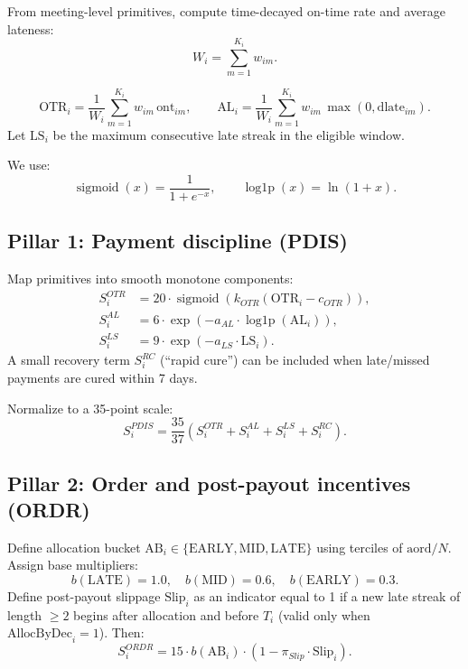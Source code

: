 \documentclass[11t]{article}
\newcommand{\sigmoid}{\operatorname{sigmoid}}
\newcommand{\logonep}{\operatorname{log1p}}
\begin{document}
From meeting-level primitives, compute time-decayed on-time rate and average lateness:
\begin{equation}
W_i = \sum_{m=1}^{K_i} w_{im}.
\end{equation}

\begin{equation}
\text{OTR}_i = \frac{1}{W_i}\sum_{m=1}^{K_i} w_{im}\,\text{ont}_{im},
\qquad
\text{AL}_i  = \frac{1}{W_i}\sum_{m=1}^{K_i} w_{im}\,\max(0,\text{dlate}_{im}).
\end{equation}
Let $\text{LS}_i$ be the maximum consecutive late streak in the eligible window.

We use:
\begin{equation}
\sigmoid(x)=\frac{1}{1+e^{-x}}, \qquad \logonep(x)=\ln(1+x).
\end{equation}

\subsection{Pillar 1: Payment discipline (PDIS)}

Map primitives into smooth monotone components:
\begin{align}
S^{OTR}_i &= 20\cdot \sigmoid\!\left(k_{OTR}(\text{OTR}_i-c_{OTR})\right),\\
S^{AL}_i  &= 6\cdot \exp\!\left(-a_{AL}\cdot \logonep(\text{AL}_i)\right),\\
S^{LS}_i  &= 9\cdot \exp\!\left(-a_{LS}\cdot \text{LS}_i\right).
\end{align}
A small recovery term $S^{RC}_i$ (``rapid cure'') can be included when late/missed payments are cured within 7 days.

Normalize to a 35-point scale:
\begin{equation}
S^{PDIS}_i = \frac{35}{37}\left(S^{OTR}_i+S^{AL}_i+S^{LS}_i+S^{RC}_i\right).
\end{equation}

\subsection{Pillar 2: Order and post-payout incentives (ORDR)}

Define allocation bucket $\text{AB}_i \in \{\text{EARLY},\text{MID},\text{LATE}\}$ using terciles of $\text{aord}/N$. Assign base multipliers:
\begin{equation}
b(\text{LATE})=1.0,\quad b(\text{MID})=0.6,\quad b(\text{EARLY})=0.3.
\end{equation}
Define post-payout slippage $\text{Slip}_i$ as an indicator equal to 1 if a new late streak of length $\ge 2$ begins after allocation and before $T_i$ (valid only when $\text{AllocByDec}_i=1$). Then:
\begin{equation}
S^{ORDR}_i = 15\cdot b(\text{AB}_i)\cdot (1-\pi_{Slip}\cdot \text{Slip}_i).
\end{equation}
\end{document}

